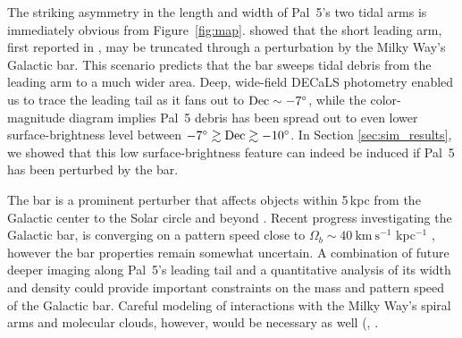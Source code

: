 \documentclass[twocolumn]{aastex62}
\newcommand{\kms}{\ensuremath{\textrm{km}~\textrm{s}^{-1}}}
\begin{document}
The striking asymmetry in the length and width of Pal~5's two tidal arms is immediately obvious from Figure~\ref{fig:map}.
\citet{Pearson:2017} showed that the short leading arm, first reported in \citet{Bernard:2016}, may be truncated through a perturbation by the Milky Way's Galactic bar. 
This scenario predicts that the bar sweeps tidal debris from the leading arm to a much wider area. 
Deep, wide-field DECaLS photometry enabled us to trace the leading tail as it fans out to $\rm Dec\sim-7^\circ$, while the color-magnitude diagram implies Pal~5 debris has been spread out to even lower surface-brightness level between $-7^\circ\gtrsim\rm Dec\gtrsim-10^\circ$. In Section \ref{sec:sim_results}, we showed that this low surface-brightness feature can indeed be induced if Pal~5 has been perturbed by the bar. 

The bar is a prominent perturber that affects objects within 5\,kpc from the Galactic center \citep[e.g., the Ophiuchus stream,][]{Price-Whelan:2016b, Hattori:2016} to the Solar circle and beyond \citep[e.g., local phase-space overdensities][]{Hunt:2018, Monari:2019}.
Recent progress investigating the Galactic bar, is converging on a pattern speed close to $\Omega_b \sim 40 ~\kms$ kpc$^{-1}$ \citep[e.g.,][]{Clarke:2019, Sanders:2019, Bovy:2019}, however the bar properties remain somewhat uncertain. A combination of future deeper imaging along Pal~5's leading tail and a quantitative analysis of its width and density could provide important constraints on the mass and pattern speed of the Galactic bar. Careful modeling of interactions with the Milky Way's spiral arms and molecular clouds, however, would be necessary as well (\citealt{Banik:2019}, \citealt{Amorisco:2016}. 
\end{document}

